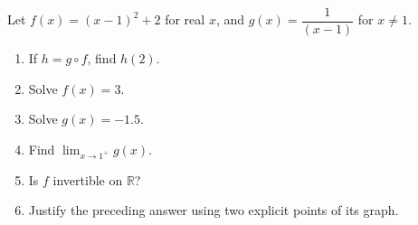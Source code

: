 Let $f(x)=(x-1)^2+2$ for real $x$, and $g(x)=\dfrac{1}{(x-1)}$ for $x\ne1$.
\begin{enumerate}
\item If $h=g\circ f$, find $h(2)$.
\item Solve $f(x)=3$.
\item Solve $g(x)=-1.5$.
\item Find $\lim_{x\to1^+}g(x)$.
\item Is $f$ invertible on $\mathbb R$?
\item Justify the preceding answer using two explicit points of its graph.
\end{enumerate}
